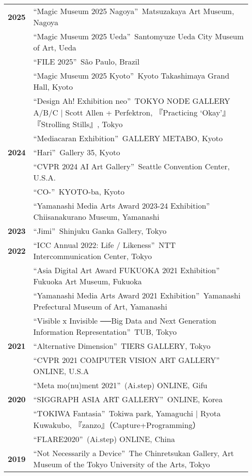 \documentclass[8pt,a4paper]{article}
\begin{document}
\begin{longtable}{@{}p{1.2cm}@{\hspace{0.5cm}}p{14cm}@{}}
\textbf{2025} & ``Magic Museum 2025 Nagoya''\, Matsuzakaya Art Museum, Nagoya \\
& ``Magic Museum 2025 Ueda''\, Santomyuze Ueda City Museum of Art, Ueda \\
& ``FILE 2025''\, São Paulo, Brazil \\
& ``Magic Museum 2025 Kyoto''\, Kyoto Takashimaya Grand Hall, Kyoto \\
& ``Design Ah! Exhibition neo''\, TOKYO NODE GALLERY A/B/C | Scott Allen + Perfektron, 『Practicing `Okay'』『Strolling Stills』, Tokyo \\
& ``Mediacaran Exhibition''\, GALLERY METABO, Kyoto \\[0.2em]
\textbf{2024} & ``Hari''\, Gallery 35, Kyoto \\
& ``CVPR 2024 AI Art Gallery''\, Seattle Convention Center, U.S.A. \\
& ``CO-''\, KYOTO-ba, Kyoto \\
& ``Yamanashi Media Arts Award 2023\mbox{-}24 Exhibition''\, Chiisanakurano Museum, Yamanashi \\[0.2em]
\textbf{2023} & ``Jimi''\, Shinjuku Ganka Gallery, Tokyo \\[0.2em]
\textbf{2022} & ``ICC Annual 2022: Life / Likeness''\, NTT Intercommunication Center, Tokyo \\
& ``Asia Digital Art Award FUKUOKA 2021 Exhibition''\, Fukuoka Art Museum, Fukuoka \\
& ``Yamanashi Media Arts Award 2021 Exhibition''\, Yamanashi Prefectural Museum of Art, Yamanashi \\
& ``Visible x Invisible ──Big Data and Next Generation Information Representation''\, TUB, Tokyo \\[0.2em]
\textbf{2021} & ``Alternative Dimension''\, TIERS GALLERY, Tokyo \\
& ``CVPR 2021 COMPUTER VISION ART GALLERY''\, ONLINE, U.S.A \\
& ``Meta mo(nu)ment 2021''\, (Ai.step) ONLINE, Gifu \\[0.2em]
\textbf{2020} & ``SIGGRAPH ASIA ART GALLERY''\, ONLINE, Korea \\
& ``TOKIWA Fantasia''\, Tokiwa park, Yamaguchi | Ryota Kuwakubo, 『zanzo』（Capture+Programming） \\
& ``FLARE2020''\, (Ai.step) ONLINE, China \\[0.2em]
\textbf{2019} & ``Not Necessarily a Device''\, The Chinretsukan Gallery, Art Museum of the Tokyo University of the Arts, Tokyo \\

\end{longtable}
\end{document}
